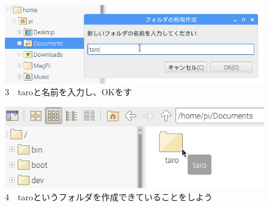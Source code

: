 \documentclass[a4paper,12pt]{jarticle}
\begin{document}
\begin{figure}[ht]
  \centering
  \begin{minipage}{0.9\textwidth}
  \includegraphics[width=\linewidth]{textbook-img039.png}
    3　taroと名前を入力し、OKをす
  \end{minipage}
  \vfill

  \centering
  \begin{minipage}{0.9\textwidth}
  \includegraphics[width=\linewidth]{textbook-img040.png}
    4　taroというフォルダを作成できていることをしよう
  \end{minipage}

\end{figure}
\clearpage
\end{document}
